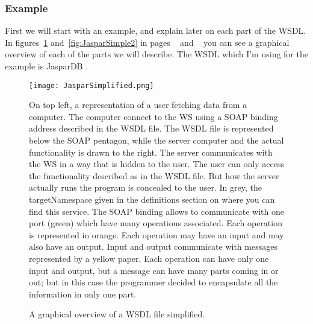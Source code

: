 \documentclass[a4paper,10pt]{article}
\begin{document}
    \subsubsection{Example}

    First we will start with an example, and explain later on each part of the WSDL. In figures~\ref{fig:JasparSimple1} and~\ref{fig:JasparSimple2} in pages ~\pageref{fig:JasparSimple1} and ~\pageref{fig:JasparSimple2} you can see a graphical overview of each of the parts we will describe. The WSDL which I'm using for the example is JasparDB \cite{jaspar2} \cite{PubMed_18006571}.

      \begin{figure}[H]
      {\centering
      \texttt{[image: JasparSimplified.png]}
      \caption{A graphical overview of a WSDL file simplified.} \label{fig:JasparSimple1}}
      \medskip
      \small
      On top left, a representation of a user fetching data from a computer. The computer connect to the WS using a SOAP binding address described in the WSDL file. The WSDL file is represented below the SOAP pentagon, while the server computer and the actual functionality is drawn to the right. The server communicates with the WS in a way that is hidden to the user. The user can only access the functionality described as in the WSDL file. But how the server actually runs the program is concealed to the user. In grey, the targetNamespace given in the definitions section on where you can find this service. The SOAP binding allows to communicate with one port (green) which have many operations associated. Each operation is represented in orange. Each operation may have an input and may also have an output. Input and output communicate with messages represented by a yellow paper. Each operation can have only one input and output, but a message can have many parts coming in or out; but in this case the programmer decided to encapsulate all the information in only one part.
      \end{figure}
\end{document}
